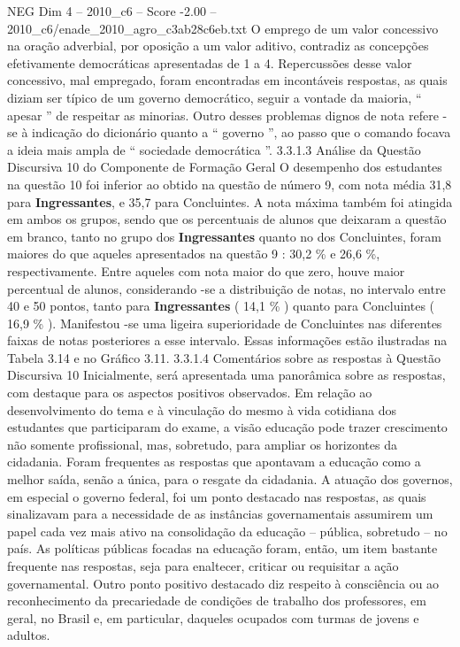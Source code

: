 \begin{textsample}{NEG Dim 4 – 2010\_c6 – Score -2.00 – 2010\_c6/enade\_2010\_agro\_c3ab28c6eb.txt}
O emprego de um valor concessivo na oração adverbial, por oposição a um valor aditivo, contradiz as concepções efetivamente democráticas apresentadas de 1 a 4.
Repercussões desse valor concessivo, mal empregado, foram encontradas em incontáveis respostas, as quais diziam ser típico de um governo democrático, seguir a vontade da maioria, “ apesar ” de respeitar as minorias.
Outro desses problemas dignos de nota refere -se à indicação do dicionário quanto a “ governo ”, ao passo que o comando focava a ideia mais ampla de “ sociedade democrática ”. 3.3.1.3 Análise da Questão Discursiva 10 do Componente de Formação Geral O desempenho dos estudantes na questão 10 foi inferior ao obtido na questão de número 9, com nota média 31,8 para \textbf{Ingressantes}, e 35,7 para Concluintes.
A nota máxima também foi atingida em ambos os grupos, sendo que os percentuais de alunos que deixaram a questão em branco, tanto no grupo dos \textbf{Ingressantes} quanto no dos Concluintes, foram maiores do que aqueles apresentados na questão 9 : 30,2 \% e 26,6 \%, respectivamente.
Entre aqueles com nota maior do que zero, houve maior percentual de alunos, considerando -se a distribuição de notas, no intervalo entre 40 e 50 pontos, tanto para \textbf{Ingressantes} ( 14,1 \% ) quanto para Concluintes ( 16,9 \% ).
Manifestou -se uma ligeira superioridade de Concluintes nas diferentes faixas de notas posteriores a esse intervalo.
Essas informações estão ilustradas na Tabela 3.14 e no Gráfico 3.11. 3.3.1.4 Comentários sobre as respostas à Questão Discursiva 10 Inicialmente, será apresentada uma panorâmica sobre as respostas, com destaque para os aspectos positivos observados.
Em relação ao desenvolvimento do tema e à vinculação do mesmo à vida cotidiana dos estudantes que participaram do exame, a visão educação pode trazer crescimento não somente profissional, mas, sobretudo, para ampliar os horizontes da cidadania.
Foram frequentes as respostas que apontavam a educação como a melhor saída, senão a única, para o resgate da cidadania.
A atuação dos governos, em especial o governo federal, foi um ponto destacado nas respostas, as quais sinalizavam para a necessidade de as instâncias governamentais assumirem um papel cada vez mais ativo na consolidação da educação – pública, sobretudo – no país.
As políticas públicas focadas na educação foram, então, um item bastante frequente nas respostas, seja para enaltecer, criticar ou requisitar a ação governamental.
Outro ponto positivo destacado diz respeito à consciência ou ao reconhecimento da precariedade de condições de trabalho dos professores, em geral, no Brasil e, em particular, daqueles ocupados com turmas de jovens e adultos.

\end{textsample}
